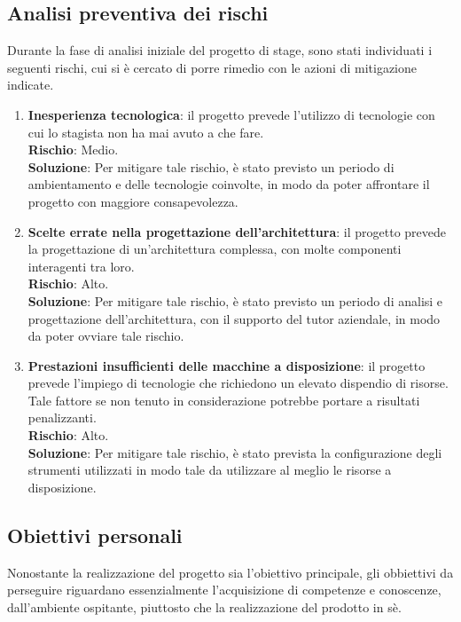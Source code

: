 \subsection{Analisi preventiva dei rischi}
Durante la fase di analisi iniziale del progetto di stage, sono stati individuati i seguenti rischi, cui si è cercato di porre rimedio con le azioni di mitigazione indicate. \\
\begin{enumerate}
    \item \textbf{Inesperienza tecnologica}: il progetto prevede l'utilizzo di tecnologie con cui lo stagista non ha mai avuto a che fare. \\
    \textbf{Rischio}: Medio.\\
    \textbf{Soluzione}: Per mitigare tale rischio, è stato previsto un periodo di ambientamento e delle tecnologie coinvolte, in modo da poter affrontare il progetto con maggiore consapevolezza.
    \item \textbf{Scelte errate nella progettazione dell'architettura}: il progetto prevede la progettazione di un'architettura complessa, con molte componenti interagenti tra loro. \\
    \textbf{Rischio}: Alto.\\
    \textbf{Soluzione}: Per mitigare tale rischio, è stato previsto un periodo di analisi e progettazione dell'architettura, con il supporto del tutor aziendale, in modo da poter ovviare tale rischio.
    \item \textbf{Prestazioni insufficienti delle macchine a disposizione}: il progetto prevede l'impiego di tecnologie che richiedono un elevato dispendio di risorse. Tale fattore se non tenuto in considerazione potrebbe portare a risultati penalizzanti. \\
    \textbf{Rischio}: Alto.\\
    \textbf{Soluzione}: Per mitigare tale rischio, è stato prevista la configurazione degli strumenti utilizzati in modo tale da utilizzare al meglio le risorse a disposizione.
\end{enumerate}    
\subsection{Obiettivi personali}
Nonostante la realizzazione del progetto sia l'obiettivo principale, gli obbiettivi da perseguire riguardano essenzialmente l'acquisizione di competenze e conoscenze, dall'ambiente ospitante, piuttosto che la realizzazione del prodotto in sè. \\

